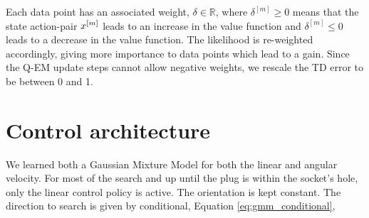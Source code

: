 Each data point has an associated weight, $\delta \in \mathbb{R}$, where $\delta^{[m]} \geq 0$ means that the 
state action-pair $x^{[m]}$ leads to an increase in the value function and $\delta^{[m]} \leq 0$ leads to 
a decrease in the value function. The likelihood is re-weighted accordingly, giving more importance to data points which lead to a gain. Since 
the Q-EM update steps cannot allow negative weights, we rescale the TD error to be between 0 and 1.


\section{Control architecture}\label{seq:control_architecture}

We learned both a Gaussian Mixture Model for both the linear and angular 
velocity. For most of the search and up until the plug is within the socket's hole, only 
the linear control policy is active. The orientation is kept constant.
The direction to search is given by conditional, Equation \ref{eq:gmm_conditional},

